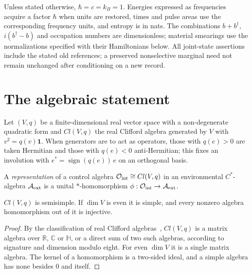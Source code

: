 Unless stated otherwise, $\hbar=c=k_B=1$. Energies expressed as
frequencies acquire a factor $\hbar$ when units are restored, times and
pulse areas use the corresponding frequency units, and entropy is in
nats. The combinations $b+b^\dagger$, $i(b^\dagger-b)$ and occupation
numbers are dimensionless; material smearings use the normalizations
specified with their Hamiltonians below.
All joint-state assertions include the stated old references; a preserved
nonselective marginal need not remain unchanged after conditioning on a
new record.

\section{The algebraic statement}
\label{sec:algebra}

Let $(V,q)$ be a finite-dimensional real vector space with a non-degenerate quadratic form and $Cl(V,q)$ the real Clifford algebra generated by $V$ with $v^2=q(v)\mathbf 1$. When generators are to act as operators, those with $q(e)>0$ are taken Hermitian and those with $q(e)<0$ anti-Hermitian; this fixes an involution with $e^*=\operatorname{sign}(q(e))\,e$ on an orthogonal basis.

\begin{definition}
\label{def:rep}
A \emph{representation} of a control algebra $\mathcal O_{\rm int}\cong Cl(V,q)$ in an environmental $C^*$-algebra $\mathcal A_{\rm ext}$ is a unital $*$-homomorphism $\phi:\mathcal O_{\rm int}\to\mathcal A_{\rm ext}$.
\end{definition}

\begin{lemma}[Semisimplicity]
\label{lem:semisimple}
$Cl(V,q)$ is semisimple. If $\dim V$ is even it is simple, and every nonzero algebra homomorphism out of it is injective.
\end{lemma}

\begin{proof}
By the classification of real Clifford algebras~\cite{ABS1964,LawsonMichelsohn1989}, $Cl(V,q)$ is a matrix algebra over $\mathbb R$, $\mathbb C$ or $\mathbb H$, or a direct sum of two such algebras, according to signature and dimension modulo eight. For even $\dim V$ it is a single matrix algebra. The kernel of a homomorphism is a two-sided ideal, and a simple algebra has none besides $0$ and itself.
\end{proof}

